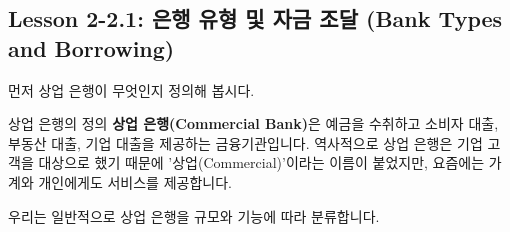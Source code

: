 \documentclass[11pt,a4paper]{article}
\theoremstyle{definition}
\begin{document}
\subsection{Lesson 2-2.1: 은행 유형 및 자금 조달 (Bank Types and Borrowing)}

먼저 상업 은행이 무엇인지 정의해 봅시다.
\begin{summarybox}{상업 은행의 정의}
\textbf{상업 은행(Commercial Bank)}은 예금을 수취하고 소비자 대출, 부동산 대출, 기업 대출을 제공하는 금융기관입니다. 역사적으로 상업 은행은 기업 고객을 대상으로 했기 때문에 '상업(Commercial)'이라는 이름이 붙었지만, 요즘에는 가계와 개인에게도 서비스를 제공합니다.
\end{summarybox}

우리는 일반적으로 상업 은행을 규모와 기능에 따라 분류합니다.
\end{document}
